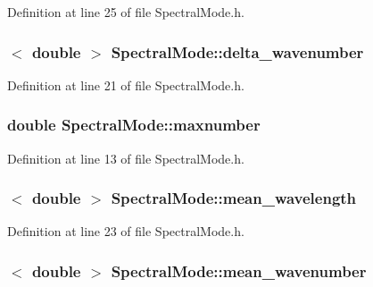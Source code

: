 Definition at line 25 of file SpectralMode.h.

\hypertarget{classSpectralMode_a79cec2adab5afc8d84f09bd3f4a222d3}{
\subsubsection[{delta\_\-wavenumber}]{$<$ double $>$ {\bf SpectralMode::delta\_\-wavenumber}}}
\label{classSpectralMode_a79cec2adab5afc8d84f09bd3f4a222d3}


Definition at line 21 of file SpectralMode.h.

\hypertarget{classSpectralMode_aa0e01cba630aff89cf934470513e7f89}{
\subsubsection[{maxnumber}]{\setlength{\rightskip}{0pt plus 5cm}double {\bf SpectralMode::maxnumber}}}
\label{classSpectralMode_aa0e01cba630aff89cf934470513e7f89}


Definition at line 13 of file SpectralMode.h.

\hypertarget{classSpectralMode_af83f2181ef2b8660feac40e7691893d6}{
\subsubsection[{mean\_\-wavelength}]{$<$ double $>$ {\bf SpectralMode::mean\_\-wavelength}}}
\label{classSpectralMode_af83f2181ef2b8660feac40e7691893d6}


Definition at line 23 of file SpectralMode.h.

\hypertarget{classSpectralMode_ad32246c8a4ebe1bfdc7879849fa6fd6f}{
\subsubsection[{mean\_\-wavenumber}]{$<$ double $>$ {\bf SpectralMode::mean\_\-wavenumber}}}
\label{classSpectralMode_ad32246c8a4ebe1bfdc7879849fa6fd6f}


